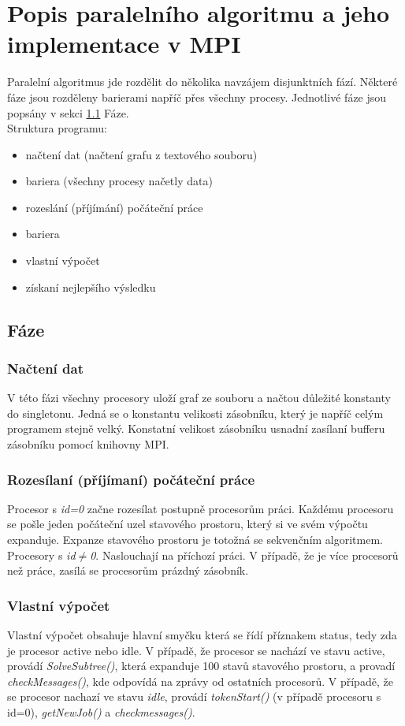 \documentclass[11pt]{article}
\begin{document}
\section{Popis paralelního algoritmu a jeho implementace v MPI}
Paralelní algoritmus jde rozdělit do několika navzájem disjunktních fází. Některé fáze jsou rozděleny barierami napříč přes všechny procesy. Jednotlivé fáze jsou popsány v sekci \ref{Fáze} Fáze. \\
Struktura programu: 
\begin{itemize}
	\item načtení dat (načtení grafu z textového souboru)
	\item bariera (všechny procesy načetly data)
	\item rozeslání (příjímání) počáteční práce
	\item bariera
	\item vlastní výpočet
	\item získaní nejlepšího výsledku
\end{itemize}

\subsection{Fáze}
\label{Fáze}

\subsubsection{Načtení dat}
V této fázi všechny procesory uloží graf ze souboru a načtou důležité konstanty do singletonu. Jedná se o konstantu velikosti zásobníku, který je napříč celým programem stejně velký. Konstatní velikost zásobníku usnadní zasílaní bufferu zásobníku pomocí knihovny MPI.

\subsubsection{Rozesílaní (příjímaní) počáteční práce}
Procesor s \textit{id=0} začne rozesílat postupně procesorům práci. Každému procesoru se pošle jeden počáteční uzel stavového prostoru, který si ve svém výpočtu expanduje.
Expanze stavového prostoru je totožná se sekvenčním algoritmem. Procesory s \textit{id$\neq$0}. Naslouchají na příchozí práci. V případě, že je více procesorů než práce, zasílá se procesorům prázdný zásobník.
\newpage
\subsubsection{Vlastní výpočet}
Vlastní výpočet obsahuje hlavní smyčku která se řídí příznakem status, tedy zda je procesor active nebo idle. V případě, že procesor se nachází ve stavu active, provádí \textit{SolveSubtree()}, která expanduje 100 stavů stavového prostoru, a provadí \textit{checkMessages()}, kde odpovídá na zprávy od ostatních procesorů. V případě, že se procesor nachazí ve stavu \textit{idle}, provádí \textit{tokenStart()} (v případě procesoru s id=0), \textit{getNewJob()} a \textit{checkmessages()}.
\end{document}
